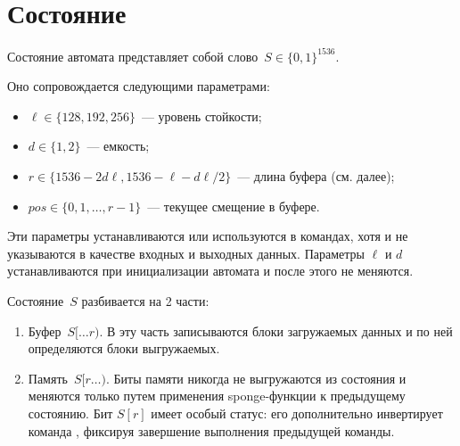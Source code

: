 \section{Состояние}\label{PRG.State}

Состояние автомата представляет собой слово~$S\in\{0,1\}^{1536}$. 

Оно сопровождается следующими параметрами:
\begin{itemize}
\item
$\ell\in\{128,192,256\}$~--- уровень стойкости;
\item
$d\in\{1,2\}$~--- емкость;
\item
$r\in\{1536-2d\ell,1536-\ell-d\ell/2\}$~--- длина буфера (см. далее);
\item
$pos\in\{0,1,\ldots,r-1\}$~--- текущее смещение в буфере.
\end{itemize}

Эти параметры устанавливаются или используются в командах, 
хотя и не указываются в качестве входных и выходных данных.
%
Параметры $\ell$ и $d$ устанавливаются при инициализации автомата и после этого 
не меняются.

Состояние~$S$ разбивается на 2 части: 
\begin{enumerate}
\item
Буфер~$S[\dots r)$.
В эту часть записываются блоки загружаемых данных и по ней определяются 
блоки выгружаемых.
\item
Память~$S[r\dots)$.
Биты памяти никогда не выгружаются из состояния и меняются только путем
применения sponge-функции к предыдущему состоянию.
%
Бит $S[r]$ имеет особый статус: его дополнительно 
инвертирует команда ,
фиксируя завершение выполнения предыдущей команды.
\end{enumerate}

